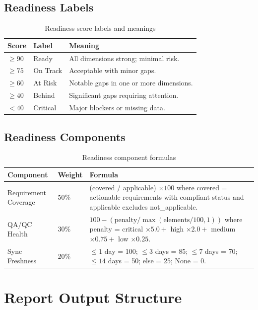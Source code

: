 \documentclass[10pt,letterpaper]{article}
\begin{document}
\subsection{Readiness Labels}

\begin{longtable}{p{0.9in}p{1.5in}p{3.2in}}
\caption{Readiness score labels and meanings}
\label{tab:readiness-labels}\\
\toprule
\textbf{Score} & \textbf{Label} & \textbf{Meaning} \\
\midrule
$\ge 90$ & Ready & All dimensions strong; minimal risk. \\
$\ge 75$ & On Track & Acceptable with minor gaps. \\
$\ge 60$ & At Risk & Notable gaps in one or more dimensions. \\
$\ge 40$ & Behind & Significant gaps requiring attention. \\
$< 40$ & Critical & Major blockers or missing data. \\
\bottomrule
\end{longtable}

\subsection{Readiness Components}

\begin{longtable}{p{1.5in}p{0.6in}p{4.0in}}
\caption{Readiness component formulas}
\label{tab:readiness-components}\\
\toprule
\textbf{Component} & \textbf{Weight} & \textbf{Formula} \\
\midrule
\endhead
Requirement Coverage & 50\% & (covered / applicable) $\times 100$ where covered = actionable
  requirements with compliant status and applicable excludes not\_applicable. \\
QA/QC Health & 30\% & $100 - (\text{penalty} / \max(\text{elements}/100, 1))$ where penalty =
  critical $\times 5.0 +$ high $\times 2.0 +$ medium $\times 0.75 +$ low $\times 0.25$. \\
Sync Freshness & 20\% & $\le 1$ day = 100; $\le 3$ days = 85; $\le 7$ days = 70;
  $\le 14$ days = 50; else = 25; None = 0. \\
\bottomrule
\end{longtable}

\section{Report Output Structure}
\end{document}
